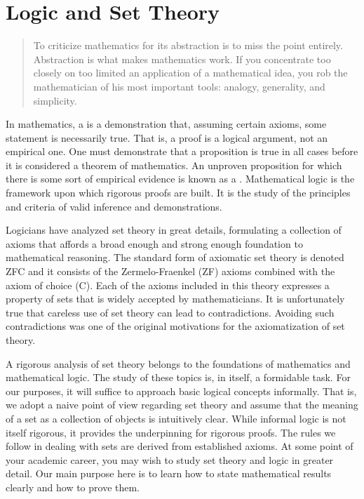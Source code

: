 \chapter{Logic and Set Theory}


\begin{quote}
To criticize mathematics for its abstraction is to miss the point entirely.
Abstraction is what makes mathematics work.
If you concentrate too closely on too limited an application of a mathematical idea, you rob the mathematician of his most important tools: analogy, generality, and simplicity.
\end{quote}


In mathematics, a  is a demonstration that, assuming certain axioms, some statement is necessarily true.
That is, a proof is a logical argument, not an empirical one.
One must demonstrate that a proposition is true in all cases before it is considered a theorem of mathematics.
An unproven proposition for which there is some sort of empirical evidence is known as a .
Mathematical logic is the framework upon which rigorous proofs are built.
It is the study of the principles and criteria of valid inference and demonstrations.

Logicians have analyzed set theory in great details, formulating a collection of axioms that affords a broad enough and strong enough foundation to mathematical reasoning.
The standard form of axiomatic set theory is denoted ZFC and it consists of the Zermelo-Fraenkel (ZF) axioms combined with the axiom of choice (C).
Each of the axioms included in this theory expresses a property of sets that is widely accepted by mathematicians.
It is unfortunately true that careless use of set theory can lead to contradictions.
Avoiding such contradictions was one of the original motivations for the axiomatization of set theory.

A rigorous analysis of set theory belongs to the foundations of mathematics and mathematical logic.
The study of these topics is, in itself, a formidable task.
For our purposes, it will suffice to approach basic logical concepts informally.
That is, we adopt a naive point of view regarding set theory and assume that the meaning of a set as a collection of objects is intuitively clear.
While informal logic is not itself rigorous, it provides the underpinning for rigorous proofs.
The rules we follow in dealing with sets are derived from established axioms.
At some point of your academic career, you may wish to study set theory and logic in greater detail.
Our main purpose here is to learn how to state mathematical results clearly and how to prove them.


